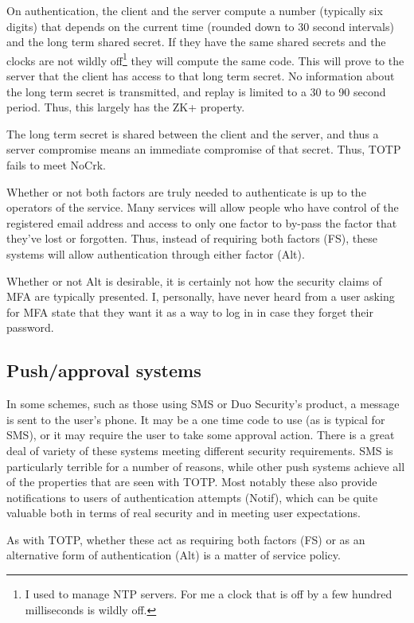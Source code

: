 \documentclass{soups}
\newcommand{\prop}[1]{\textsf{#1}}
\begin{document}
On authentication, the client and the server compute a number (typically six digits) that depends on the current time (rounded down to 30 second intervals) and the long term shared secret.
If they have the same shared secrets and the clocks are not wildly off\footnote{I used to manage NTP servers. For me a clock that is off by a few hundred milliseconds is wildly off.} they will compute the same code. This will prove to the server that the client has access to that long term secret. No information about the long term secret is transmitted, and replay is limited to a 30 to 90 second period.
Thus, this largely has the \prop{ZK+} property.

The long term secret is shared between the client and the server, and thus a server compromise means an immediate compromise of that secret. Thus, TOTP fails to meet \prop{NoCrk}.

Whether or not both factors are truly needed to authenticate is up to the operators of the service. Many services will allow people who have control of the registered email address and access to only one factor to by-pass the factor that they've lost or forgotten.
Thus, instead of requiring both factors (\prop{FS}), these systems will allow authentication through either factor (\prop{Alt}).

Whether or not \prop{Alt} is desirable, it is certainly not how the security claims of MFA are typically presented.
I, personally, have never heard from a user asking for MFA state that they want it as a way to log in in case they forget their password.

\subsection{Push/approval systems}\label{sec:push}

In some schemes, such as those using SMS or Duo Security's product,
a message is sent to the user's phone.
It may be a one time code to use (as is typical for SMS),
or it may require the user to take some approval action.
There is a great deal of variety of these systems
meeting different security requirements.
SMS is particularly terrible for a number of reasons, while other push systems achieve all of the properties that are seen with TOTP\@.
Most notably these also provide notifications to users of authentication
attempts (\prop{Notif}), which can be quite valuable both in terms of real security and in meeting user expectations.

As with TOTP, whether these act as requiring both factors (\prop{FS}) or as an alternative form of authentication (\prop{Alt}) is a matter of service policy.
\end{document}
